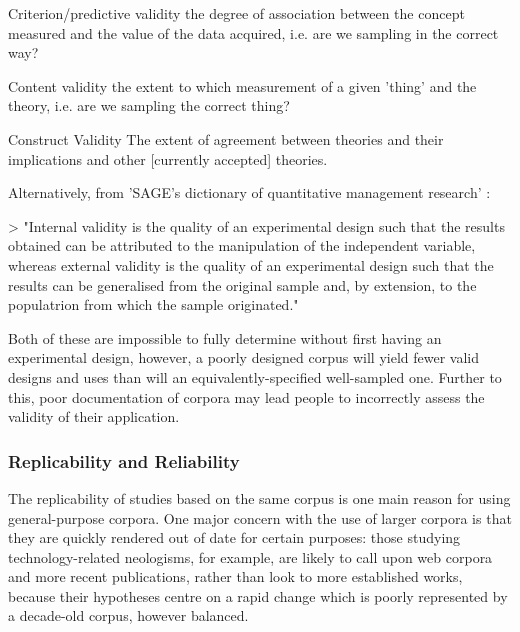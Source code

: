\begin{itemizeTitle}
 \item [Criterion/predictive validity] the degree of association between the concept measured and the value of the data acquired, i.e. are we sampling in the correct way?
 \item [Content validity] the extent to which measurement of a given 'thing' and the theory, i.e. are we sampling the correct thing?
 \item [Construct Validity] The extent of agreement between theories and their implications and other [currently accepted] theories. 
\end{itemizeTitle}

Alternatively, from 'SAGE's dictionary of quantitative management research' :

> "Internal validity is the quality of an experimental design such that the results obtained can be attributed to the manipulation of the independent variable, whereas external validity is the quality of an experimental design such that the results can be generalised from the original sample and, by extension, to the populatrion from which the sample originated."

Both of these are impossible to fully determine without first having an experimental design, however, a poorly designed corpus will yield fewer valid designs and uses than will an equivalently-specified well-sampled one.  Further to this, poor documentation of corpora may lead people to incorrectly assess the validity of their application.





\subsubsection{Replicability and Reliability}
The replicability of studies based on the same corpus is one main reason for using general-purpose corpora.  One major concern with the use of larger corpora is that they are quickly rendered out of date for certain purposes: those studying technology-related neologisms, for example, are likely to call upon web corpora and more recent publications, rather than look to more established works, because their hypotheses centre on a rapid change which is poorly represented by a decade-old corpus, however balanced.

